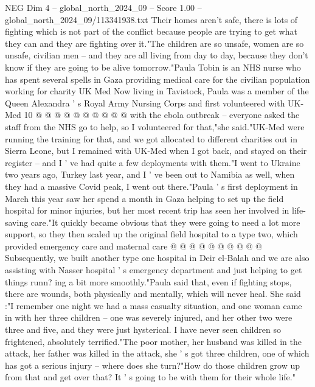 \begin{textsample}{NEG Dim 4 – global\_north\_2024\_09 – Score 1.00 – global\_north\_2024\_09/113341938.txt}
Their homes aren't safe, there is lots of fighting which is not part of the conflict because people are trying to get what they can and they are fighting over it."The children are so unsafe, women are so unsafe, civilian men -- and they are all living from day to day, because they don't know if they are going to be alive tomorrow."Paula Tobin is an NHS nurse who has spent several spells in Gaza providing medical care for the civilian population working for charity UK Med Now living in Tavistock, Paula was a member of the Queen Alexandra ' s Royal Army Nursing Corps and first volunteered with UK-Med 10 @ @ @ @ @ @ @ @ @ @ with the ebola outbreak -- everyone asked the staff from the NHS go to help, so I volunteered for that,"she said."UK-Med were running the training for that, and we got allocated to different charities out in Sierra Leone, but I remained with UK-Med when I got back, and stayed on their register -- and I ' ve had quite a few deployments with them."I went to Ukraine two years ago, Turkey last year, and I ' ve been out to Namibia as well, when they had a massive Covid peak, I went out there."Paula ' s first deployment in March this year saw her spend a month in Gaza helping to set up the field hospital for minor injuries, but her most recent trip has seen her involved in life-saving care."It quickly became obvious that they were going to need a lot more support, so they then scaled up the original field hospital to a type two, which provided emergency care and maternal care @ @ @ @ @ @ @ @ @ @ Subsequently, we built another type one hospital in Deir el-Balah and we are also assisting with Nasser hospital ' s emergency department and just helping to get things runn? ing a bit more smoothly."Paula said that, even if fighting stops, there are wounds, both physically and mentally, which will never heal.
She said :"I remember one night we had a mass casualty situation, and one woman came in with her three children -- one was severely injured, and her other two were three and five, and they were just hysterical.
I have never seen children so frightened, absolutely terrified."The poor mother, her husband was killed in the attack, her father was killed in the attack, she ' s got three children, one of which has got a serious injury -- where does she turn?"How do those children grow up from that and get over that?
It ' s going to be with them for their whole life."

\end{textsample}
